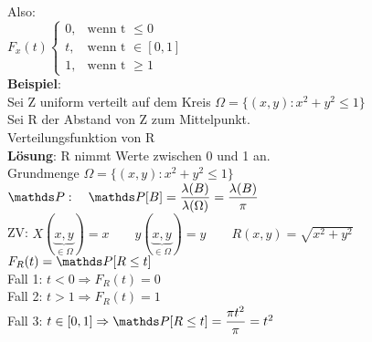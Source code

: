 Also: \\
$F_x(t) \begin{cases}
0, & \text{wenn t }  \leq 0\\
t, & \text{wenn t }\in [0,1] \\
1, & \text{wenn t } \geq 1
\end{cases}$\medskip\\
\textbf{Beispiel}:\\
Sei Z uniform verteilt auf dem Kreis $\Omega = \{(x,y): x^2+y^2 \leq 1\}$\\
Sei R der Abstand von Z zum Mittelpunkt. \\
Verteilungsfunktion von R\smallskip\\
\textbf{Lösung}: R nimmt Werte zwischen 0 und 1 an.\smallskip\\
Grundmenge $\Omega = \{(x,y): x^2+y^2\leq 1\}$\smallskip\\
$\PP: \quad \PP [B] = \dfrac{\lambda(B)}{\lambda(\Omega)} = \dfrac{\lambda(B)}{\pi}$\medskip\\
ZV: $X(\underbrace{x,y}_{\in \Omega}) = x \qquad y(\underbrace{x,y}_{\in \Omega}) = y \qquad R(x,y) = \sqrt{x^2+y^2}$\medskip\\
$F_R(t) = \PP[R\leq t]$\smallskip\\
Fall 1: $t<0 \Rightarrow F_R(t) = 0$\smallskip\\
Fall 2: $t>1 \Rightarrow F_R(t) = 1$\smallskip\\
Fall 3: $t \in [0,1] \Rightarrow \PP [R \leq t] = \dfrac{\pi t^2}{\pi}= t^2$\smallskip\\\smallskip\\
